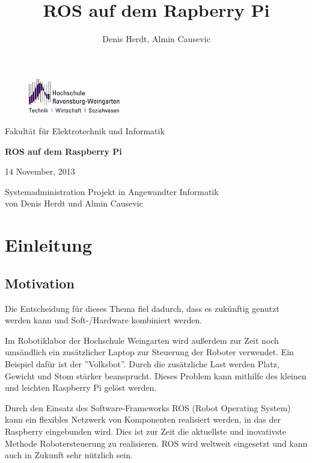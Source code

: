\documentclass[12pt]{article}
\author{Denis Herdt, Almin Causevic}
\title{ROS auf dem Rapberry Pi}
\begin{document}
\begin{figure}[h]

\includegraphics[width=4cm]{hs-logo.jpg}
\end{figure}
Fakultät für Elektrotechnik und Informatik

\vspace{3cm}

\begin{center}

{\bf \huge ROS auf dem Raspberry Pi}
\vspace{4cm}

14 November, 2013
\vspace{1cm}

Systemadministration Projekt in Angewandter Informatik \\
von Denis Herdt und Almin Causevic

\end{center}

\pagebreak

\tableofcontents

\pagebreak

\section{Einleitung}
\subsection{Motivation}

Die Entscheidung für dieses Thema fiel dadurch, dass es zukünftig genutzt werden kann und Soft-/Hardware kombiniert werden.

Im Robotiklabor der Hochschule Weingarten wird außerdem zur Zeit noch umsändlich ein zusätzlicher Laptop zur Steuerung der Roboter verwendet. Ein Beispiel dafür ist der ''Volksbot''. Durch die zusätzliche Last werden Platz, Gewicht und Stom stärker beansprucht. Dieses Problem kann mithilfe des kleinen und leichten Raspberry Pi gelöst werden.

Durch den Einsatz des Software-Frameworks ROS (Robot Operating System) kann ein flexibles Netzwerk von Komponenten realisiert werden, in das der Raspberry eingebunden wird. Dies ist zur Zeit die aktuellste und inovativste Methode Robotersteuerung zu realisieren. ROS wird weltweit eingesetzt und kann auch in Zukunft sehr nützlich sein.
\end{document}
